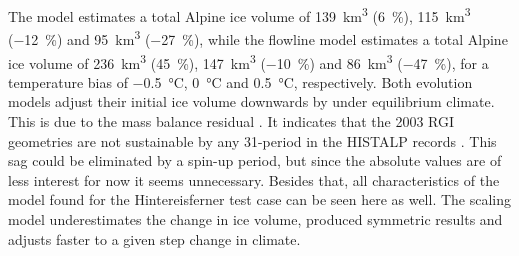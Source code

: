         The \vas{} model estimates a total Alpine ice volume of \SI{139}{\cubic\kilo\meter} (\SI{+6}{\percent}), \SI{115}{\cubic\kilo\meter} (\SI{-12}{\percent}) and \SI{95}{\cubic\kilo\meter} (\SI{-27}{\percent}), while the flowline model estimates a total Alpine ice volume of \SI{236}{\cubic\kilo\meter} (\SI{+45}{\percent}), \SI{147}{\cubic\kilo\meter} (\SI{-10}{\percent}) and \SI{86}{\cubic\kilo\meter} (\SI{-47}{\percent}), for a temperature bias of \SI{-.5}{\celsius}, \SI{0}{\celsius} and \SI{+.5}{\celsius}, respectively. 
        Both evolution models adjust their initial ice volume downwards by under equilibrium climate. This is due to the mass balance residual \bias{}. It indicates that the 2003 RGI geometries are not sustainable by any 31-period in the HISTALP records \citep{Maussion2019}. This sag could be eliminated by a spin-up period, but since the absolute values are of less interest for now it seems unnecessary. Besides that, all characteristics of the \vas{} model found for the Hintereisferner test case can be seen here as well. The \vas{} scaling model underestimates the change in ice volume, produced symmetric results and adjusts faster to a given step change in climate. 

